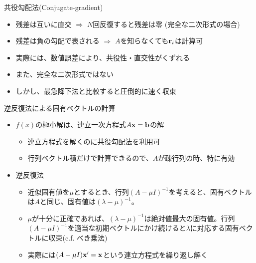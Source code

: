\begin{frame}[t,fragile]{共役勾配法(Conjugate-gradient)}
  \begin{itemize}
    \setlength{\itemsep}{1em}
  \item 残差は互いに直交 $\Rightarrow$ $N$回反復すると残差は零 (完全な二次形式の場合)
  \item 残差は負の勾配で表される $\Rightarrow$ $A$を知らなくても${\bf r}_i$は計算可
  \item 実際には、数値誤差により、共役性・直交性がくずれる
  \item また、完全な二次形式ではない
  \item しかし、最急降下法と比較すると圧倒的に速く収束
  \end{itemize}
\end{frame}

\begin{frame}[t,fragile]{逆反復法による固有ベクトルの計算}
  \begin{itemize}
    \setlength{\itemsep}{1em}
  \item $f(x)$の極小解は、連立一次方程式$A{\bf x} = {\bf b}$の解
    \begin{itemize}
    \item 連立方程式を解くのに共役勾配法を利用可
    \item 行列ベクトル積だけで計算できるので、$A$が疎行列の時、特に有効
    \end{itemize}
  \item 逆反復法
    \begin{itemize}
    \item 近似固有値を$\mu$とするとき、行列$(A - \mu I)^{-1}$を考えると、固有ベクトルは$A$と同じ、固有値は$(\lambda-\mu)^{-1}$。
    \item $\mu$が十分に正確であれば、$(\lambda-\mu)^{-1}$は絶対値最大の固有値。行列$(A - \mu I)^{-1}$を適当な初期ベクトルにかけ続けると$\lambda$に対応する固有ベクトルに収束(c.f. べき乗法)
    \item 実際には$(A-\mu I) {\bf x}' = {\bf x}$という連立方程式を繰り返し解く
    \end{itemize}
  \end{itemize}
\end{frame}
